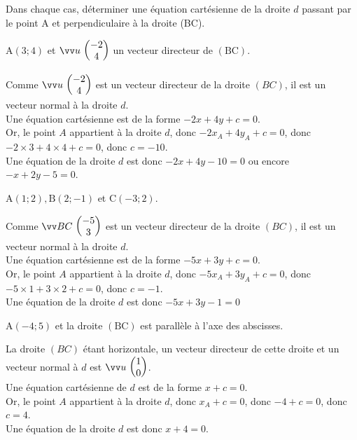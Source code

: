 \documentclass[12pt,a4paper]{article}  %
\begin{document}
Dans chaque cas, déterminer une équation cartésienne de la droite $d$ passant par le point $\mathrm{A}$ et perpendiculaire à la droite (BC).
\begin{enumMet}
	\item {} $\mathrm{A}(3 ; 4)$ et $\Coord{u}{-2}{4}$ un vecteur directeur de $(\mathrm{BC})$.\\
	\begin{corrBox}
		Comme $\Coord{u}{-2}{4}$ est un vecteur directeur de la droite $(B C)$, il est un vecteur normal à la droite $d$.\\
		Une équation cartésienne est de la forme $-2x+4 y+c=0$.\\
		Or, le point $A$ appartient à la droite $d$, donc $-2x_{A}+4y_{A}+c=0$, donc $-2 \times 3+4 \times 4+c=0$, donc $c=-10$.\\
		Une équation de la droite $d$ est donc $-2 x+4 y-10=0$ ou encore $-x+2y-5=0$.
	\end{corrBox}
	\item $\mathrm{A}(1 ; 2), \mathrm{B}(2 ;-1)$ et $\mathrm{C}(-3 ; 2)$.\\
	\begin{corrBox}
		Comme $\Coord{BC}{-5}{3}$  est un vecteur directeur de la droite $(B C)$, il est un vecteur normal à la droite $d$.\\
		Une équation cartésienne est de la forme $-5x+3y+c=0$.\\
		Or, le point $A$ appartient à la droite $d$, donc $-5x_{A}+3y_{A}+c=0$, donc $-5\times 1+3 \times 2+c=0$, donc $c=-1$.\\
		Une équation de la droite $d$ est donc $-5x+3 y-1=0$        
	\end{corrBox}
	\item $\mathrm{A}(-4 ; 5)$ et la droite $(\mathrm{BC})$ est parallèle à l'axe des abscisses.\\
	\begin{corrBox}
		La droite $(B C)$ étant horizontale, un vecteur directeur de cette droite et un vecteur normal à $d$ est $\Coord{u}{1}{0}$.\\
		Une équation cartésienne de $d$ est de la forme $x+c=0$.\\
		Or, le point $A$ appartient à la droite $d$, donc $x_{A}+c=0$, donc $-4+c=0$, donc $c=4$.\\
		Une équation de la droite $d$ est donc $x+4=0$.        
	\end{corrBox}
\end{enumMet}
\end{document}
